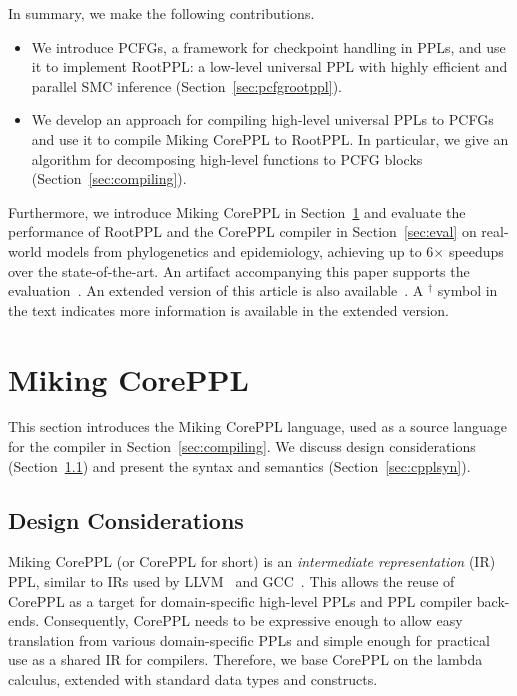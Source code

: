 \documentclass[runningheads]{llncs}
\begin{document}
In summary, we make the following contributions.
\begin{itemize}
  \item
    We introduce PCFGs, a framework for checkpoint handling in PPLs, and use it to implement RootPPL: a low-level universal PPL with highly efficient and parallel SMC inference (Section~\ref{sec:pcfgrootppl}).

  \item
    We develop an approach for compiling high-level universal PPLs to PCFGs and use it to compile Miking CorePPL to RootPPL.
    In particular, we give an algorithm for decomposing high-level functions to PCFG blocks
    (Section~\ref{sec:compiling}).
\end{itemize}

Furthermore, we introduce Miking CorePPL in Section~\ref{sec:coreppl} and evaluate the performance of RootPPL and the CorePPL compiler in Section~\ref{sec:eval} on real-world models from phylogenetics and epidemiology, achieving up to 6$\times$ speedups over the state-of-the-art.
An artifact accompanying this paper supports the evaluation~\cite{lunden2022compilingartifact}.
\ifextended
\else
An extended version of this article is also available~\cite{lunden2022compiling}.
A $^\dagger$ symbol in the text indicates more information is available in the extended version.
\fi

\section{Miking CorePPL}\label{sec:coreppl}
This section introduces the Miking CorePPL language, used as a source language for the compiler in Section~\ref{sec:compiling}.
We discuss design considerations (Section~\ref{sec:cppldesign}) and present the syntax and semantics (Section~\ref{sec:cpplsyn}).

\subsection{Design Considerations}\label{sec:cppldesign}
Miking CorePPL (or CorePPL for short) is an \emph{intermediate representation} (IR) PPL, similar to IRs used by LLVM~\cite{llvm2021} and GCC~\cite{gcc2021}.
This allows the reuse of CorePPL as a target for domain-specific high-level PPLs and PPL compiler back-ends.
Consequently, CorePPL needs to be expressive enough to allow easy translation from various domain-specific PPLs and simple enough for practical use as a shared IR for compilers.
Therefore, we base CorePPL on the lambda calculus, extended with standard data types and constructs.
\end{document}
